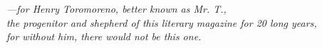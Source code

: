 \vspace*{\fill}
\begin{center}
    \textit{
        ---for Henry Toromoreno, better known as Mr. T.,\\
        the progenitor and shepherd of this literary magazine for 20 long years,\\
        for without him, there would not be this one.
    }
\end{center}
\vspace*{\fill}